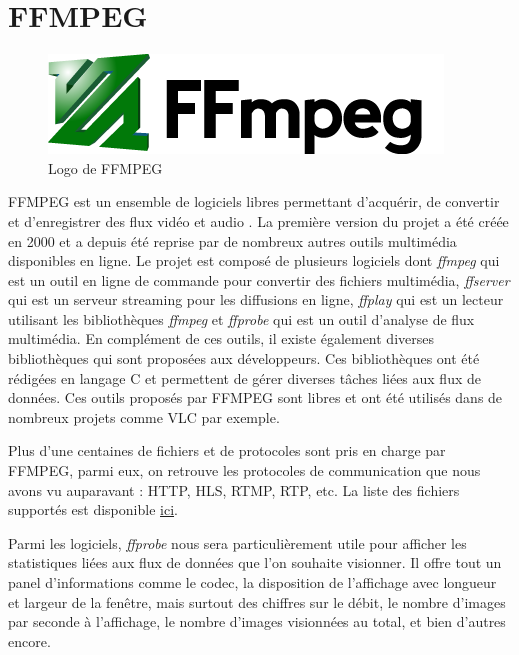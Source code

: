 \documentclass{polytech/polytech}
\begin{document}
\section{FFMPEG}

\begin{figure}
	\includegraphics[scale=0.5]{images/ffmpeg}
	\caption{Logo de FFMPEG}
	\label{fig:logoffmpeg}
\end{figure}

FFMPEG est un ensemble de logiciels libres permettant d’acquérir, de convertir et d’enregistrer des flux vidéo et audio \cite{_ffmpeg_2017}. La première version du projet a été créée en 2000 et a depuis été reprise par de nombreux autres outils multimédia disponibles en ligne. Le projet est composé de plusieurs logiciels dont \textit{ffmpeg} qui est un outil en ligne de commande pour convertir des fichiers multimédia, \textit{ffserver} qui est un serveur streaming pour les diffusions en ligne, \textit{ffplay} qui est un lecteur utilisant les bibliothèques \textit{ffmpeg} et \textit{ffprobe} qui est un outil d’analyse de flux multimédia. En complément de ces outils, il existe également diverses bibliothèques qui sont proposées aux développeurs. Ces bibliothèques ont été rédigées en langage C et permettent de gérer diverses tâches liées aux flux de données. Ces outils proposés par FFMPEG sont libres et ont été utilisés dans de nombreux projets comme VLC par exemple.

Plus d’une centaines de fichiers et de protocoles sont pris en charge par FFMPEG, parmi eux, on retrouve les protocoles de communication que nous avons vu auparavant : HTTP, HLS, RTMP, RTP, etc. La liste des fichiers supportés est disponible \href{http://ffmpeg.org/general.html#Supported-File-Formats_002c-Codecs-or-Features}{ici}.

Parmi les logiciels, \textit{ffprobe} nous sera particulièrement utile pour afficher les statistiques liées aux flux de données que l’on souhaite visionner. Il offre tout un panel d’informations comme le codec, la disposition de l’affichage avec longueur et largeur de la fenêtre, mais surtout des chiffres sur le débit, le nombre d’images par seconde à l’affichage, le nombre d’images visionnées au total, et bien d’autres encore.
\end{document}
